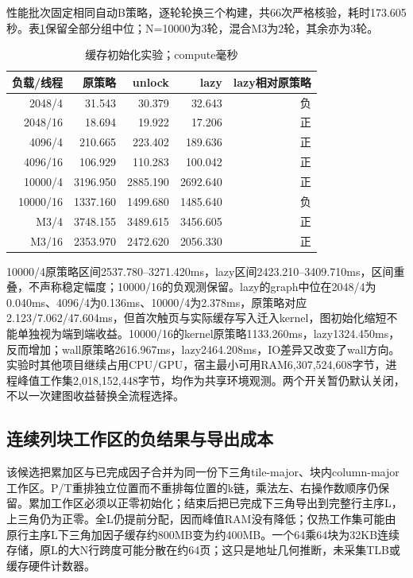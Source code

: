 \documentclass[UTF8,a4paper,11pt]{ctexart}
\begin{document}
性能批次固定相同自动B策略，逐轮轮换三个构建，共66次严格核验，耗时173.605秒。表\ref{tab:lazy}保留全部分组中位；N=10000为3轮，混合M3为2轮，其余亦为3轮。
\begin{table}[htbp]\centering\small
\caption{缓存初始化实验；compute毫秒}\label{tab:lazy}
\begin{tabular}{rrrrr}\toprule
负载/线程&原策略&unlock&lazy&lazy相对原策略\\\midrule
2048/4&31.543&30.379&32.643&负\\
2048/16&18.694&19.922&17.206&正\\
4096/4&210.665&223.402&189.636&正\\
4096/16&106.929&110.283&100.042&正\\
10000/4&3196.950&2885.190&2692.640&正\\
10000/16&1337.160&1499.680&1485.640&负\\
M3/4&3748.155&3489.615&3456.605&正\\
M3/16&2353.970&2472.620&2056.330&正\\\bottomrule
\end{tabular}\end{table}
10000/4原策略区间2537.780--3271.420ms，lazy区间2423.210--3409.710ms，区间重叠，不声称稳定幅度；10000/16的负观测保留。lazy的graph中位在2048/4为0.040ms、4096/4为0.136ms、10000/4为2.378ms，原策略对应2.123/7.062/47.604ms，但首次触页与实际缓存写入迁入kernel，图初始化缩短不能单独视为端到端收益。10000/16的kernel原策略1133.260ms，lazy1324.450ms，反而增加；wall原策略2616.967ms，lazy2464.208ms，IO差异又改变了wall方向。实验时其他项目继续占用CPU/GPU，宿主最小可用RAM6,307,524,608字节，进程峰值工作集2,018,152,448字节，均作为共享环境观测。两个开关暂仍默认关闭，不以一次建图收益替换全流程选择。

\subsection{连续列块工作区的负结果与导出成本}
该候选把累加区与已完成因子合并为同一份下三角tile-major、块内column-major工作区。P/T重排独立位置而不重排每位置的k链，乘法左、右操作数顺序仍保留。累加工作区必须以正零初始化；结束后把已完成下三角导出到完整行主序L，上三角仍为正零。全L仍提前分配，因而峰值RAM没有降低；仅热工作集可能由原行主序L下三角加因子缓存约800MB变为约400MB。一个64乘64块为32KB连续存储，原L的大N行跨度可能分散在约64页；这只是地址几何推断，未采集TLB或缓存硬件计数器。
\end{document}
